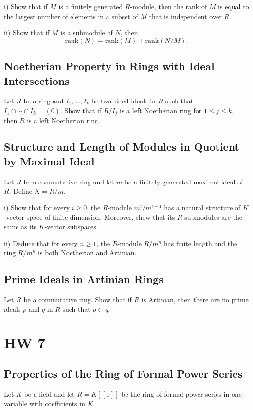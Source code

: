 \documentclass[lang=cn,11pt]{template}
\begin{document}
i) Show that if \( M \) is a finitely generated \( R \)-module, then the rank of \( M \) is equal to the largest number of elements in a subset of \( M \) that is independent over \( R \).

ii) Show that if \( M \) is a submodule of \( N \), then
\[
\text{rank}(N) = \text{rank}(M) + \text{rank}(N/M).
\]

\section{Noetherian Property in Rings with Ideal Intersections}
Let \( R \) be a ring and \( I_1, \ldots, I_k \) be two-sided ideals in \( R \) such that \( I_1 \cap \cdots \cap I_k = (0) \). Show that if \( R/I_j \) is a left Noetherian ring for \( 1 \leq j \leq k \), then \( R \) is a left Noetherian ring.

\section{Structure and Length of Modules in Quotient by Maximal Ideal}
Let \( R \) be a commutative ring and let \( m \) be a finitely generated maximal ideal of \( R \). Define \( K = R/m \).

i) Show that for every \( i \geq 0 \), the \( R \)-module \( m^i / m^{i+1} \) has a natural structure of \( K \)-vector space of finite dimension. Moreover, show that its \( R \)-submodules are the same as its \( K \)-vector subspaces.

ii) Deduce that for every \( n \geq 1 \), the \( R \)-module \( R / m^n \) has finite length and the ring \( R / m^n \) is both Noetherian and Artinian.

\section{Prime Ideals in Artinian Rings}
Let \( R \) be a commutative ring. Show that if \( R \) is Artinian, then there are no prime ideals \( p \) and \( q \) in \( R \) such that \( p \subset q \).








\chapter{HW 7}

\section{Properties of the Ring of Formal Power Series}
Let \( K \) be a field and let \( R = K[[x]] \) be the ring of formal power series in one variable with coefficients in \( K \).
\end{document}
